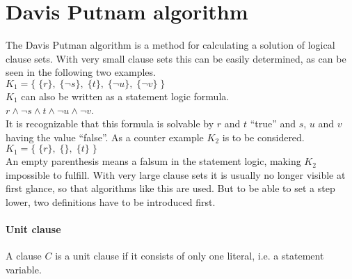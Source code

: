 \section{Davis Putnam algorithm}
The Davis Putman algorithm is a method for calculating a solution of logical clause sets. With very small clause sets this can be easily determined, as can be seen in the following two examples.
\\
\hspace*{1.3cm} 
$K_1 = \bigl\{\; \{r\},\; \{\neg s\},\; \{t\},\; \{\neg u\}, \; \{\neg v\} \;\bigr\}$ 
\\[0.2cm]
$K_1$ %
can also be written as a statement logic formula.
\\[0.2cm]
\hspace*{1.3cm}
$r \wedge \neg s \wedge t \wedge \neg u \wedge \neg v$.
\\[0.2cm]
It is recognizable that this formula is solvable by $r$ and $t$ \enquote{true} and $s$, $u$ and $v$ having the value \enquote{false}.
As a counter example $K_2$ is to be considered.
\hspace*{1.3cm}
$K_1 = \bigl\{\; \{r\},\; \{\},\; \{t\} \;\bigr\}$ 
\\[0.2cm]
An empty parenthesis means a falsum in the statement logic, making $K_2$ impossible to fulfill.
With very large clause sets it is usually no longer visible at first glance, so that algorithms like this are used. But to be able to set a step lower, two definitions have to be introduced first. \cite{Zhang2000}
\paragraph{Unit clause} %
A clause $C$ is a unit clause if it consists of only one literal, i.e. a statement variable.
